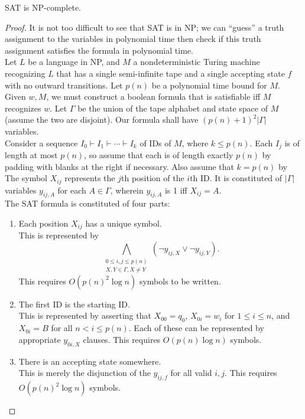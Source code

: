 	\begin{ftheo}
		\textsf{SAT} is \textsf{NP}-complete.
	\end{ftheo}
	\begin{proof}
		It is not too difficult to see that \textsf{SAT} is in \textsf{NP}; we can ``guess'' a truth assignment to the variables in polynomial time then check if this truth assignment satisfies the formula in polynomial time.\\
		Let $L$ be a language in \textsf{NP}, and $M$ a nondeterministic Turing machine recognizing $L$ that has a single semi-infinite tape and a single accepting state $f$ with no outward transitions. Let $p(n)$ be a polynomial time bound for $M$. \\
		Given $w,M$, we must construct a boolean formula that is satisfiable iff $M$ recognizes $w$. Let $\Gamma$ be the union of the tape alphabet and state space of $M$ (assume the two are disjoint). Our formula shall have $(p(n)+1)^2 |\Gamma|$ variables.\\
		Consider a sequence $I_0 \vdash I_1 \vdash \cdots \vdash I_{k}$ of IDs of $M$, where $k \le p(n)$. Each $I_j$ is of length at most $p(n)$, so assume that each is of length exactly $p(n)$ by padding with blanks at the right if necessary. Also assume that $k = p(n)$ by  The symbol $X_{ij}$ represents the $j$th position of the $i$th ID. It is constituted of $|\Gamma|$ variables $y_{ij,A}$ for each $A \in \Gamma$, wherein $y_{ij,A}$ is 1 iff $X_{ij} = A$.\\
		The SAT formula is constituted of four parts:
		\begin{enumerate}
			\item Each position $X_{ij}$ has a unique symbol.\\
			This is represented by
			\[ \bigwedge_{\substack{0 \le i,j \le p(n) \\ X,Y \in \Gamma, X \ne Y}} (\neg y_{ij,X} \lor \neg y_{ij,Y} ). \]
			This requires $O(p(n)^2 \log n)$ symbols to be written.

			\item The first ID is the starting ID. \\
			This is represented by asserting that $X_{00} = q_0$, $X_{0i} = w_i$ for $1 \le i \le n$, and $X_{0i} = B$ for all $n < i \le p(n)$. Each of these can be represented by appropriate $y_{0i,X}$ clauses. This requires $O(p(n) \log n)$ symbols.

			\item There is an accepting state somewhere. \\
			This is merely the disjunction of the $y_{ij,f}$ for all valid $i,j$. This requires $O(p(n)^2 \log n)$ symbols.


\end{enumerate}
\end{proof}
